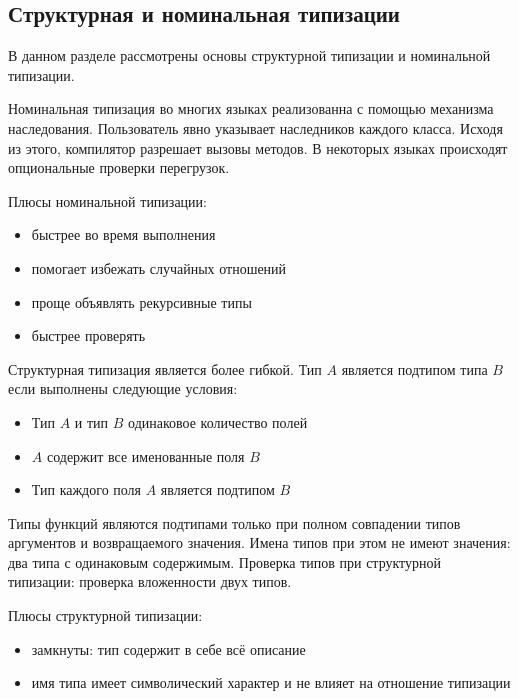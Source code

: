 \subsection{Структурная и номинальная типизации}
В данном разделе рассмотрены основы структурной типизации и номинальной типизации.

Номинальная типизация во многих языках реализованна с помощью механизма наследования. Пользователь явно указывает наследников каждого класса. Исходя из этого, компилятор разрешает вызовы методов. В некоторых языках происходят опциональные проверки перегрузок.

Плюсы номинальной типизации:
\begin{itemize}
    \item быстрее во время выполнения
    \item помогает избежать случайных отношений
    \item проще объявлять рекурсивные типы
    \item быстрее проверять
\end{itemize}

Структурная типизация является более гибкой. Тип $A$ является подтипом типа $B$ если выполнены следующие условия:
\begin{itemize}
    \item Тип $A$ и тип $B$ одинаковое количество полей
    \item $A$ содержит все именованные поля $B$
    \item Тип каждого поля $A$ является подтипом $B$
\end{itemize}
Типы функций являются подтипами только при полном совпадении типов аргументов и возвращаемого значения. Имена типов при этом не имеют значения: два типа с одинаковым содержимым. Проверка типов при структурной типизации: проверка вложенности двух типов.

Плюсы структурной типизации:
\begin{itemize}
    \item замкнуты: тип содержит в себе всё описание
    \item имя типа имеет символический характер и не влияет на отношение типизации
\end{itemize}
